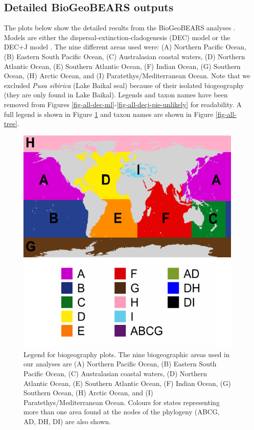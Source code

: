 \documentclass[a4paper, 12pt]{article}
\begin{document}
\subsection{Detailed BioGeoBEARS outputs}

The plots below show the detailed results from the BioGeoBEARS analyses \citep{matzke2013probabilistic}. Models are either the dispersal-extinction-cladogenesis (DEC) model \citep{ree2008maximum} or the DEC+J model \citep{matzke2014model}. 
The nine different areas used were: (A) Northern Pacific Ocean, (B) Eastern South Pacific Ocean, (C) Australasian coastal waters, (D) Northern Atlantic Ocean, (E) Southern Atlantic Ocean, (F) Indian Ocean, (G) Southern Ocean, (H) Arctic Ocean, and (I) Paratethys/Mediterranean Ocean. Note that we excluded \textit{Pusa sibirica} (Lake Baikal seal) because of their isolated biogeography (they are only found in Lake Baikal). 
Legends and taxon names have been removed from Figures \ref{fig-all-dec-ml}-\ref{fig-all-decj-pie-unlikely} for readability. 
A full legend is shown in Figure \ref{fig-legend} and taxon names are shown in Figure \ref{fig-all-tree}.

\begin{figure}[H]
 \centering
  \includegraphics[width = 0.5\linewidth]{figures/BGB-legend.pdf}
  \caption{Legend for biogeography plots. The nine biogeographic areas used in our analyses are (A) Northern Pacific Ocean, (B) Eastern South Pacific Ocean, (C) Australasian coastal waters, (D) Northern Atlantic Ocean, (E) Southern Atlantic Ocean, (F) Indian Ocean, (G) Southern Ocean, (H) Arctic Ocean, and (I) Paratethys/Mediterranean Ocean. Colours for states representing more than one area found at the nodes of the phylogeny (ABCG, AD, DH, DI) are also shown.}
  \label{fig-legend}
\end{figure} 
\end{document}
